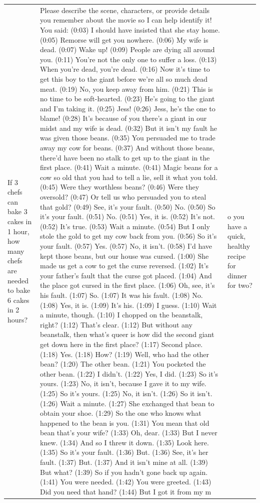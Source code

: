 \begin{table}[ht]
\begin{tabular}{p{4.3cm}p{4.3cm}p{4.3cm}}
If 3 chefs can bake 3 cakes in 1 hour, how many chefs are needed to bake 6 cakes in 2 hours? & Please describe the scene, characters, or provide details you remember about the movie so I can help identify it!        You said: (0:03) I should have insisted that she stay home. (0:05) Remorse will get you nowhere. (0:06) My wife is dead. (0:07) Wake up! (0:09) People are dying all around you. (0:11) You're not the only one to suffer a loss. (0:13) When you're dead, you're dead. (0:16) Now it's time to get this boy to the giant before we're all so much dead meat. (0:19) No, you keep away from him. (0:21) This is no time to be soft-hearted. (0:23) He's going to the giant and I'm taking it. (0:25) Jess! (0:26) Jess, he's the one to blame! (0:28) It's because of you there's a giant in our midst and my wife is dead. (0:32) But it isn't my fault he was given those beans. (0:35) You persuaded me to trade away my cow for beans. (0:37) And without those beans, there'd have been no stalk to get up to the giant in the first place. (0:41) Wait a minute. (0:41) Magic beans for a cow so old that you had to tell a lie, sell it what you told. (0:45) Were they worthless beans? (0:46) Were they oversold? (0:47) Or tell us who persuaded you to steal that gold? (0:49) See, it's your fault. (0:50) No. (0:50) So it's your fault. (0:51) No. (0:51) Yes, it is. (0:52) It's not. (0:52) It's true. (0:53) Wait a minute. (0:54) But I only stole the gold to get my cow back from you. (0:56) So it's your fault. (0:57) Yes. (0:57) No, it isn't. (0:58) I'd have kept those beans, but our house was cursed. (1:00) She made us get a cow to get the curse reversed. (1:02) It's your father's fault that the curse got placed. (1:04) And the place got cursed in the first place. (1:06) Oh, see, it's his fault. (1:07) So. (1:07) It was his fault. (1:08) No. (1:08) Yes, it is. (1:09) It's his. (1:09) I guess. (1:10) Wait a minute, though. (1:10) I chopped on the beanstalk, right? (1:12) That's clear. (1:12) But without any beanstalk, then what's queer is how did the second giant get down here in the first place? (1:17) Second place. (1:18) Yes. (1:18) How? (1:19) Well, who had the other bean? (1:20) The other bean. (1:21) You pocketed the other bean. (1:22) I didn't. (1:22) Yes, I did. (1:23) So it's yours. (1:23) No, it isn't, because I gave it to my wife. (1:25) So it's yours. (1:25) No, it isn't. (1:26) So it isn't. (1:26) Wait a minute. (1:27) She exchanged that bean to obtain your shoe. (1:29) So the one who knows what happened to the bean is you. (1:31) You mean that old bean that's your wife? (1:33) Oh, dear. (1:33) But I never knew. (1:34) And so I threw it down. (1:35) Look here. (1:35) So it's your fault. (1:36) But. (1:36) See, it's her fault. (1:37) But. (1:37) And it isn't mine at all. (1:39) But what? (1:39) So if you hadn't gone back up again. (1:41) You were needed. (1:42) You were greeted. (1:43) Did you need that hand? (1:44) But I got it from my m & o you have a quick, healthy recipe for dinner for two? \\[4pt]

\end{tabular}
\end{table}
